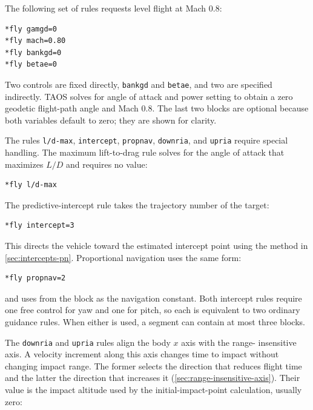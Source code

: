 The following set of rules requests level flight at Mach 0.8:

\begin{lstlisting}[style=taosmanual]
*fly gamgd=0
*fly mach=0.80
*fly bankgd=0
*fly betae=0
\end{lstlisting}

Two controls are fixed directly, \texttt{bankgd} and \texttt{betae}, and two are
specified indirectly. TAOS solves for angle of attack and power setting to obtain a
zero geodetic flight-path angle and Mach 0.8. The last two blocks are optional because
both variables default to zero; they are shown for clarity.


The rules \texttt{l/d-max}, \texttt{intercept}, \texttt{propnav},
\texttt{downria}, and \texttt{upria} require special handling. The maximum
lift-to-drag rule solves for the angle of attack that maximizes $L/D$ and requires no
value:

\begin{lstlisting}[style=taosmanual]
*fly l/d-max
\end{lstlisting}

The predictive-intercept rule takes the trajectory number of the target:

\begin{lstlisting}[style=taosmanual]
*fly intercept=3
\end{lstlisting}

This directs the vehicle toward the estimated intercept point using the method in
\cref{sec:intercepts-pn}. Proportional navigation uses the same
form:

\begin{lstlisting}[style=taosmanual]
*fly propnav=2
\end{lstlisting}

and uses  from the  block as the navigation
constant. Both intercept rules require one free control for yaw and one for pitch, so
each is equivalent to two ordinary guidance rules. When either is used, a segment
can contain at most three  blocks.

The \texttt{downria} and \texttt{upria} rules align the body $x$ axis with the range-
insensitive axis. A velocity increment along this axis changes time to impact without
changing impact range. The former selects the direction that reduces flight time and
the latter the direction that increases it (\cref{sec:range-insensitive-axis}). Their
value is the impact altitude used by the initial-impact-point calculation, usually zero:

